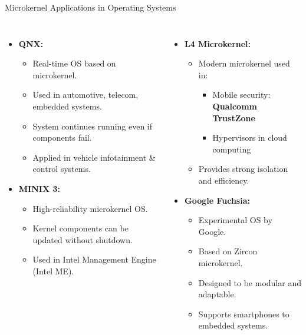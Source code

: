 \documentclass[aspectratio=169, table]{beamer}
\begin{document}
\begin{frame}{\Large{Microkernel Applications in Operating Systems}}
\vspace{20pt}
\begin{columns}
\begin{itemize}
	\item \textbf{QNX:}
	\begin{itemize}
		\item Real-time OS based on microkernel.
		\item Used in automotive, telecom, embedded systems.
		\item System continues running even if components fail.
		\item Applied in vehicle infotainment \& control systems.
	\end{itemize}
	\vspace{0.3cm}
	\item \textbf{MINIX 3:}
	\begin{itemize}
		\item High-reliability microkernel OS.
		\item Kernel components can be updated without shutdown.
		\item Used in Intel Management Engine (Intel ME).
	\end{itemize}
\end{itemize}

\begin{itemize}
	\item \textbf{L4 Microkernel:}
	\begin{itemize}
		\item Modern microkernel used in:
		\begin{itemize}
			\item Mobile security: \textbf{Qualcomm TrustZone}
			\item Hypervisors in cloud computing
		\end{itemize}
		\item Provides strong isolation and efficiency.
	\end{itemize}
	\vspace{0.3cm}
	\item \textbf{Google Fuchsia:}
	\begin{itemize}
		\item Experimental OS by Google.
		\item Based on Zircon microkernel.
		\item Designed to be modular and adaptable.
		\item Supports smartphones to embedded systems.
	\end{itemize}
\end{itemize}
\end{columns}
\end{frame}
\end{document}
